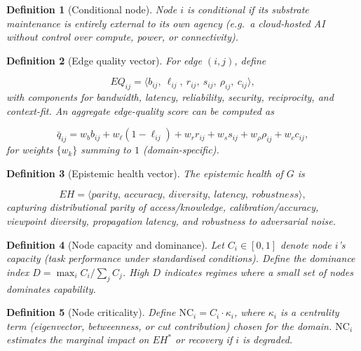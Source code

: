 \documentclass[12pt]{article}
\newtheorem{definition}{Definition}
\begin{document}
\begin{definition}[Conditional node]
Node $i$ is \emph{conditional} if its substrate maintenance is entirely external to its own agency (e.g.\ a cloud-hosted AI without control over compute, power, or connectivity).

\end{definition}

\begin{definition}[Edge quality vector]\label{def:eq} For edge $(i,j)$, define

\[ EQ_{ij}=\langle b_{ij},\ \ell_{ij},\ r_{ij},\ s_{ij},\ \rho_{ij},\ c_{ij}\rangle,

\] with components for bandwidth, latency, reliability, security, reciprocity, and context-fit. An aggregate edge-quality score can be computed as

\[
\bar{q}_{ij}=w_b b_{ij}+w_\ell (1-\ell_{ij})+w_r r_{ij}+w_s s_{ij}+w_\rho \rho_{ij}+w_c c_{ij},
\] for weights $\{w_k\}$ summing to $1$ (domain-specific).

\end{definition}

\begin{definition}[Epistemic health vector]\label{def:eh} The \emph{epistemic health} of $G$ is

\[ EH=\langle parity,\ accuracy,\ diversity,\ latency,\ robustness\rangle,

\] capturing distributional parity of access/knowledge, calibration/accuracy, viewpoint diversity, propagation latency, and robustness to adversarial noise.

\end{definition}

\begin{definition}[Node capacity and dominance]\label{def:capacity}
Let $C_i\in[0,1]$ denote node $i$'s capacity (task performance under standardised conditions). Define the \emph{dominance index} $D=\max_i C_i/\sum_j C_j$. High $D$ indicates regimes where a small set of nodes dominates capability.

\end{definition}

\begin{definition}[Node criticality]\label{def:criticality}
Define $\mathrm{NC}_i=C_i \cdot \kappa_i$, where $\kappa_i$ is a centrality term (eigenvector, betweenness, or cut contribution) chosen for the domain. $\mathrm{NC}_i$ estimates the marginal impact on $EH^{\ast}$ or recovery if $i$ is degraded.

\end{definition}
\end{document}

